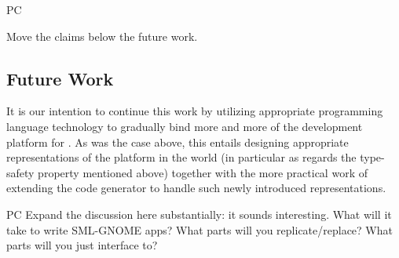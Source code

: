 \documentclass[workingdraft]{usetex-v1}
\begin{document}
\begin{ednote}{PC}
  
Move the claims below the future work.

\end{ednote}


\subsection{Future Work}

It is our intention to continue this work by utilizing appropriate
programming language technology to gradually bind more and more of the
\gnome development platform for \sml. As was the case above, this
entails designing appropriate representations of the platform in the
\sml world (in particular as regards the type-safety property mentioned
above) together with the more practical work of extending the code
generator to handle such newly introduced representations.


\begin{ednote}{PC}
  Expand the discussion here substantially: it sounds
interesting.  What will it take to write SML-GNOME apps?
What parts will you replicate/replace?  What parts will you
just interface to?

\end{ednote}



\end{document}
